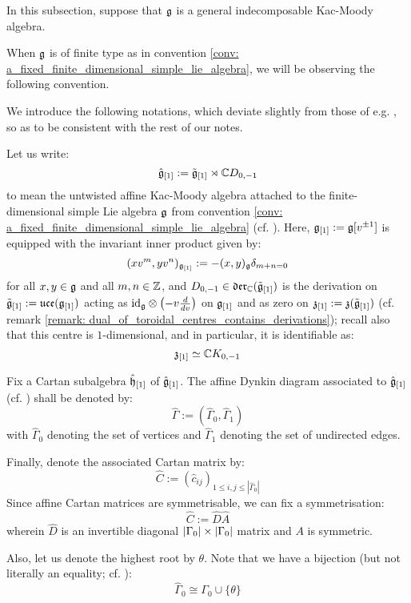         \begin{convention}
            In this subsection, suppose that $\mathfrak{g}$ is a general indecomposable Kac-Moody algebra. 
        \end{convention}
        When $\mathfrak{g}$ is of finite type as in convention \ref{conv: a_fixed_finite_dimensional_simple_lie_algebra}, we will be observing the following convention.
        \begin{convention} \label{conv: a_fixed_untwisted_affine_kac_moody_algebra}
            We introduce the following notations, which deviate slightly from those of e.g. \cite[Chapter 7]{kac_infinite_dimensional_lie_algebras}, so as to be consistent with the rest of our notes.
        
            Let us write:
                $$\hat{\mathfrak{g}}_{[1]} := \tilde{\mathfrak{g}}_{[1]} \rtimes \mathbb{C} D_{0, -1}$$
            to mean the untwisted affine Kac-Moody algebra attached to the finite-dimensional simple Lie algebra $\mathfrak{g}$ from convention \ref{conv: a_fixed_finite_dimensional_simple_lie_algebra} (cf. \cite[Chapter 7]{kac_infinite_dimensional_lie_algebras}). Here, $\mathfrak{g}_{[1]} := \mathfrak{g}[v^{\pm 1}]$ is equipped with the invariant inner product given by:
                $$(x v^m, y v^n)_{\mathfrak{g}_{[1]}} := -(x, y)_{\mathfrak{g}} \delta_{m + n = 0}$$
            for all $x, y \in \mathfrak{g}$ and all $m, n \in \mathbb{Z}$, and $D_{0, -1} \in \mathfrak{der}_{\mathbb{C}}(\tilde{\mathfrak{g}}_{[1]})$ is the derivation on $\tilde{\mathfrak{g}}_{[1]} := \mathfrak{uce}(\mathfrak{g}_{[1]})$ acting as $\id_{\g} \tensor \left( -v \frac{d}{dv} \right)$ on $\mathfrak{g}_{[1]}$ and as zero on $\mathfrak{z}_{[1]} := \mathfrak{z}(\tilde{\mathfrak{g}}_{[1]})$ (cf. remark \ref{remark: dual_of_toroidal_centres_contains_derivations}); recall also that this centre is $1$-dimensional, and in particular, it is identifiable as:
                $$\mathfrak{z}_{[1]} \simeq \mathbb{C} K_{0, -1}$$

            Fix a Cartan subalgebra $\hat{\mathfrak{h}}_{[1]}$ of $\hat{\mathfrak{g}}_{[1]}$. The affine Dynkin diagram associated to $\hat{\mathfrak{g}}_{[1]}$ (cf. \cite[Chapter 4]{kac_infinite_dimensional_lie_algebras}) shall be denoted by:
                $$\hat{\Gamma} := ( \hat{\Gamma}_0, \hat{\Gamma}_1 )$$
            with $\hat{\Gamma}_0$ denoting the set of vertices and $\hat{\Gamma}_1$ denoting the set of undirected edges.

            Finally, denote the associated Cartan matrix by:
                $$\hat{C} := (\hat{c}_{ij})_{1 \leq i, j \leq |\hat{\Gamma}_0|}$$
            Since affine Cartan matrices are symmetrisable, we can fix a symmetrisation:
                $$\hat{C} := \hat{D} \hat{A}$$
            wherein $\hat{D}$ is an invertible diagonal $|\Gamma_0| \x |\Gamma_0|$ matrix and $A$ is symmetric. 

            Also, let us denote the highest root by $\theta$. Note that we have a bijection (but not literally an equality; cf. \cite[Chapters 4, 5, 7]{kac_infinite_dimensional_lie_algebras}):
                $$\hat{\Gamma}_0 \cong \Gamma_0 \cup \{\theta\}$$
        \end{convention}
